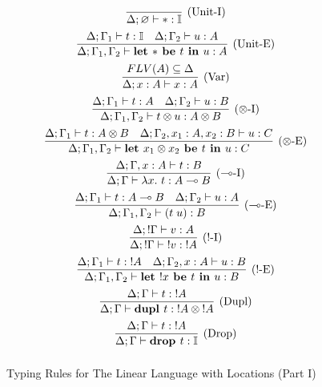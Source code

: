 \documentclass[]{unswthesis}
\let\emptyset\varnothing
\newcommand{\lam}[1]{\lambda #1 \ldotp \,}
\newcommand{\app}[2]{(#1 \; #2)}
\newcommand{\lolly}{\multimap}
\newcommand{\types}{\vdash}
\newcommand{\letbe}[3]{\textbf{let $#1$ be $#2$ in $#3$}}
\newcommand{\dupl}[1]{\textbf{dupl $#1$}}
\newcommand{\drop}[1]{\textbf{drop $#1$}}
\let\t\text
\begin{document}
\begin{figure}[H]
\caption{Typing Rules for The Linear Language with Locations (Part I)}
\label{l3_typing_part1}
\begin{displaymath}
\arraycolsep=0.5pt\def\arraystretch{2.2}
\begin{array}{c}
\infer[\t{(Unit-I)}]{\Delta; \emptyset \types * : \mathbb{I}}{} \\
\infer[\t{(Unit-E)}]{\Delta; \Gamma_1, \Gamma_2 \types \letbe{*}{t}{u} : A}{
  \Delta; \Gamma_1 \types t : \mathbb{I}  &  \Delta; \Gamma_2 \types u : A
} \\
\infer[\t{(Var)}]{\Delta; x : A \types x : A}{FLV(A) \subseteq \Delta} \\
\infer[\t{($\otimes$-I)}]{\Delta; \Gamma_1, \Gamma_2 \types t \otimes u : A \otimes B}{
  \Delta; \Gamma_1 \types t : A  &  \Delta; \Gamma_2 \types u : B
} \\
\infer[\t{($\otimes$-E)}]
{\Delta; \Gamma_1, \Gamma_2 \types \letbe{x_1 \otimes x_2}{t}{u} : C}
{\Delta; \Gamma_1 \types t : A \otimes B  &
 \Delta; \Gamma_2, x_1 : A, x_2 : B \types u : C} \\
\infer[\t{($\lolly$-I)}]{\Delta; \Gamma \types \lam{x} t : A \lolly B}{
  \Delta; \Gamma, x : A \types t : B
} \\
\infer[\t{($\lolly$-E)}]{\Delta; \Gamma_1, \Gamma_2 \types \app{t}{u} : B}{
  \Delta; \Gamma_1 \types t : A \lolly B  &  \Delta; \Gamma_2 \types u : A
} \\
\infer[\t{(!-I)}]{\Delta; !\Gamma \types {!v} : {!A}}{\Delta; !\Gamma \types v : A} \\
\infer[\t{(!-E)}]{\Delta; \Gamma_1, \Gamma_2 \types \letbe{!x}{t}{u} : B}{
  \Delta; \Gamma_1 \types t : {!A}  &  \Delta; \Gamma_2, x : A \types u : B
}\\
\infer[\t{(Dupl)}]{\Delta; \Gamma \types \dupl{t} : {!A} \otimes {!A}}{
  \Delta; \Gamma \types t : {!A}
} \\
\infer[\t{(Drop)}]{\Delta; \Gamma \types \drop{t} : \mathbb{I}}{
  \Delta; \Gamma \types t : {!A}
} \\

\end{array}
\end{displaymath}
\end{figure}

\end{document}
